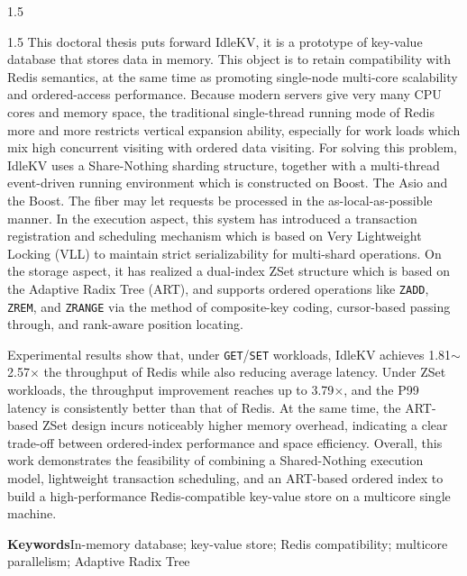 \documentclass[a4paper,12pt,fontset=none,twoside]{article}
\numberwithin{figure}{section}
\numberwithin{equation}{section}
\numberwithin{table}{section}
\begin{document}
\begin{spacing}{1.5}
			\begin{spacing}{1.5}
			This doctoral thesis puts forward IdleKV, it is a prototype of key-value database that stores data in memory. This object is to retain compatibility with Redis semantics, at the same time as promoting single-node multi-core scalability and ordered-access performance. Because modern servers give very many CPU cores and memory space, the traditional single-thread running mode of Redis more and more restricts vertical expansion ability, especially for work loads which mix high concurrent visiting with ordered data visiting. For solving this problem, IdleKV uses a Share-Nothing sharding structure, together with a multi-thread event-driven running environment which is constructed on Boost. The Asio and the Boost. The fiber may let requests be processed in the as-local-as-possible manner. In the execution aspect, this system has introduced a transaction registration and scheduling mechanism which is based on Very Lightweight Locking (VLL) to maintain strict serializability for multi-shard operations. On the storage aspect, it has realized a dual-index ZSet structure which is based on the Adaptive Radix Tree (ART), and supports ordered operations like \texttt{ZADD}, \texttt{ZREM}, and \texttt{ZRANGE} via the method of composite-key coding, cursor-based passing through, and rank-aware position locating.

			Experimental results show that, under \texttt{GET}/\texttt{SET} workloads, IdleKV achieves 1.81$\sim$2.57$\times$ the throughput of Redis while also reducing average latency. Under ZSet workloads, the throughput improvement reaches up to 3.79$\times$, and the P99 latency is consistently better than that of Redis. At the same time, the ART-based ZSet design incurs noticeably higher memory overhead, indicating a clear trade-off between ordered-index performance and space efficiency. Overall, this work demonstrates the feasibility of combining a Shared-Nothing execution model, lightweight transaction scheduling, and an ART-based ordered index to build a high-performance Redis-compatible key-value store on a multicore single machine.

			\vspace{0.5em}

			{\textbf{Keywords}}\quad In-memory database; key-value store; Redis compatibility; multicore parallelism; Adaptive Radix Tree

	\end{spacing}


	\newpage


\end{spacing}
\end{document}
